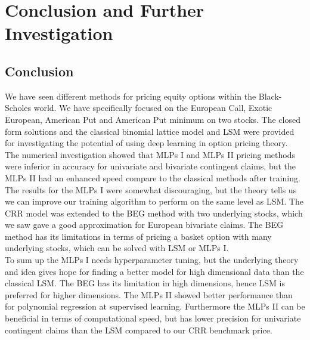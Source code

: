 
\chapter{Conclusion and Further Investigation} %

\label{Chapter7} %


\section{Conclusion}
We have seen different methods for pricing equity options within the Black-Scholes world. We have specifically focused on the European Call, Exotic European, American Put and American Put minimum on two stocks. The closed form solutions and the classical binomial lattice model and LSM were provided for investigating the potential of using deep learning in option pricing theory. \\

The numerical investigation showed that MLPs I and MLPs II pricing methods were inferior in accuracy for univariate and bivariate contingent claims, but the MLPs II had an enhanced speed compare to the classical methods after training. The results for the MLPs I were somewhat discouraging, but the theory tells us we can improve our training algorithm to perform on the same level as LSM. The CRR model was extended to the BEG method with two underlying stocks, which we saw gave a good approximation for European bivariate claims. The BEG method has its limitations in terms of pricing a basket option with many underlying stocks, which can be solved with LSM or MLPs I.\\

To sum up the MLPs I needs hyperparameter tuning, but the underlying theory and idea gives hope for finding a better model for high dimensional data than the classical LSM. The BEG has its limitation in high dimensions, hence LSM is preferred for higher dimensions. The MLPs II showed better performance than for polynomial regression at supervised learning. Furthermore the MLPs II can be beneficial in terms of computational speed, but has lower precision for univariate contingent claims than the LSM compared to our CRR benchmark price.\\


